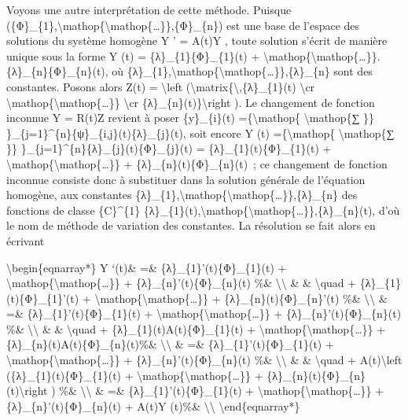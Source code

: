 \documentclass[]{article}
\begin{document}
Voyons une autre interprétation de cette méthode. Puisque
(\{Φ\}\_\{1\},\textbackslash{}mathop\{\textbackslash{}mathop\{\ldots{}\}\},\{Φ\}\_\{n\})
est une base de l'espace des solutions du système homogène Y ' = A(t)Y ,
toute solution s'écrit de manière unique sous la forme Y (t) =
\{λ\}\_\{1\}\{Φ\}\_\{1\}(t) +
\textbackslash{}mathop\{\textbackslash{}mathop\{\ldots{}\}\}.\{λ\}\_\{n\}\{Φ\}\_\{n\}(t),
où
\{λ\}\_\{1\},\textbackslash{}mathop\{\textbackslash{}mathop\{\ldots{}\}\},\{λ\}\_\{n\}
sont des constantes. Posons alors Z(t) = \textbackslash{}left
(\textbackslash{}matrix\{\textbackslash{},\{λ\}\_\{1\}(t)
\textbackslash{}cr
\textbackslash{}mathop\{\textbackslash{}mathop\{\ldots{}\}\}
\textbackslash{}cr \{λ\}\_\{n\}(t)\}\textbackslash{}right ). Le
changement de fonction inconnue Y = R(t)Z revient à poser
\{y\}\_\{i\}(t) =\{\textbackslash{}mathop\{ \textbackslash{}mathop\{∑
\}\} \}\_\{j=1\}\^{}\{n\}\{ψ\}\_\{i,j\}(t)\{λ\}\_\{j\}(t), soit encore Y
(t) =\{\textbackslash{}mathop\{ \textbackslash{}mathop\{∑ \}\}
\}\_\{j=1\}\^{}\{n\}\{λ\}\_\{j\}(t)\{Φ\}\_\{j\}(t) =
\{λ\}\_\{1\}(t)\{Φ\}\_\{1\}(t) +
\textbackslash{}mathop\{\textbackslash{}mathop\{\ldots{}\}\} +
\{λ\}\_\{n\}(t)\{Φ\}\_\{n\}(t)~; ce changement de fonction inconnue
consiste donc à substituer dans la solution générale de l'équation
homogène, aux constantes
\{λ\}\_\{1\},\textbackslash{}mathop\{\textbackslash{}mathop\{\ldots{}\}\},\{λ\}\_\{n\}
des fonctions de classe \{C\}\^{}\{1\}
\{λ\}\_\{1\}(t),\textbackslash{}mathop\{\textbackslash{}mathop\{\ldots{}\}\},\{λ\}\_\{n\}(t),
d'où le nom de méthode de variation des constantes. La résolution se
fait alors en écrivant

\textbackslash{}begin\{eqnarray*\} Y `(t)\& =\&
\{λ\}\_\{1\}'(t)\{Φ\}\_\{1\}(t) +
\textbackslash{}mathop\{\textbackslash{}mathop\{\ldots{}\}\} +
\{λ\}\_\{n\}'(t)\{Φ\}\_\{n\}(t) \%\& \textbackslash{}\textbackslash{} \&
\& \textbackslash{}quad + \{λ\}\_\{1\}(t)\{Φ\}\_\{1\}'(t) +
\textbackslash{}mathop\{\textbackslash{}mathop\{\ldots{}\}\} +
\{λ\}\_\{n\}(t)\{Φ\}\_\{n\}'(t) \%\& \textbackslash{}\textbackslash{} \&
=\& \{λ\}\_\{1\}'(t)\{Φ\}\_\{1\}(t) +
\textbackslash{}mathop\{\textbackslash{}mathop\{\ldots{}\}\} +
\{λ\}\_\{n\}'(t)\{Φ\}\_\{n\}(t) \%\& \textbackslash{}\textbackslash{} \&
\& \textbackslash{}quad + \{λ\}\_\{1\}(t)A(t)\{Φ\}\_\{1\}(t) +
\textbackslash{}mathop\{\textbackslash{}mathop\{\ldots{}\}\} +
\{λ\}\_\{n\}(t)A(t)\{Φ\}\_\{n\}(t)\%\& \textbackslash{}\textbackslash{}
\& =\& \{λ\}\_\{1\}'(t)\{Φ\}\_\{1\}(t) +
\textbackslash{}mathop\{\textbackslash{}mathop\{\ldots{}\}\} +
\{λ\}\_\{n\}'(t)\{Φ\}\_\{n\}(t) \%\& \textbackslash{}\textbackslash{} \&
\& \textbackslash{}quad + A(t)\textbackslash{}left
(\{λ\}\_\{1\}(t)\{Φ\}\_\{1\}(t) +
\textbackslash{}mathop\{\textbackslash{}mathop\{\ldots{}\}\} +
\{λ\}\_\{n\}(t)\{Φ\}\_\{n\}(t)\textbackslash{}right ) \%\&
\textbackslash{}\textbackslash{} \& =\& \{λ\}\_\{1\}'(t)\{Φ\}\_\{1\}(t)
+ \textbackslash{}mathop\{\textbackslash{}mathop\{\ldots{}\}\} +
\{λ\}\_\{n\}'(t)\{Φ\}\_\{n\}(t) + A(t)Y (t)\%\&
\textbackslash{}\textbackslash{} \textbackslash{}end\{eqnarray*\}
\end{document}
